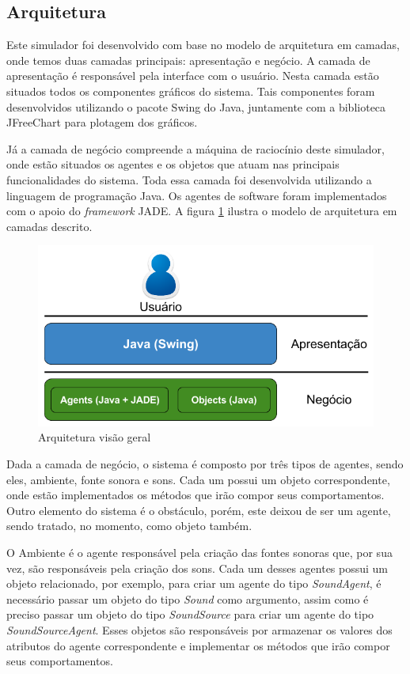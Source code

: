 \subsection{Arquitetura}

Este simulador foi desenvolvido com base no modelo de arquitetura em camadas, onde temos duas camadas principais: apresentação e negócio. A camada de apresentação é responsável pela interface com o usuário. Nesta camada estão situados todos os componentes gráficos do sistema. Tais componentes foram desenvolvidos utilizando o pacote Swing do Java, juntamente com a biblioteca JFreeChart para plotagem dos gráficos. 

Já a camada de negócio compreende a máquina de raciocínio deste simulador, onde estão situados os agentes e os objetos que atuam nas principais funcionalidades do sistema. Toda essa camada foi desenvolvida utilizando a linguagem de programação Java. Os agentes de software foram implementados com o apoio do \textit{framework} JADE. A figura \ref{arquitetura_geral} ilustra o modelo de arquitetura em camadas descrito.

\FloatBarrier 
\begin{figure}[!htb]
\centering
\includegraphics[scale=0.55]{figuras/arquitetura_geral}
\caption{Arquitetura visão geral}
\label{arquitetura_geral}
\end{figure}

Dada a camada de negócio, o sistema é composto por três tipos de agentes, sendo eles, ambiente, fonte sonora e sons. Cada um possui um objeto correspondente, onde estão implementados os métodos que irão compor seus comportamentos. Outro elemento do sistema é o obstáculo, porém, este deixou de ser um agente, sendo tratado, no momento, como objeto também. 

O Ambiente é o agente responsável pela criação das fontes sonoras que, por sua vez, são responsáveis pela criação dos sons. Cada um desses agentes possui um objeto relacionado, por exemplo, para criar um agente do tipo \textit{SoundAgent}, é necessário passar um objeto do tipo \textit{Sound} como argumento, assim como é preciso passar um objeto do tipo \textit{SoundSource} para criar um agente do tipo \textit{SoundSourceAgent}. Esses objetos são responsáveis por armazenar os valores dos atributos do agente correspondente e implementar os métodos que irão compor seus comportamentos.

